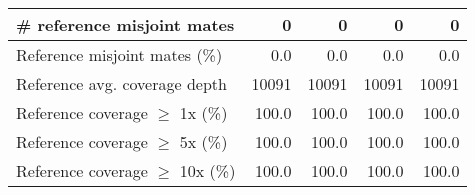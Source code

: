 \documentclass[12pt,a4paper]{article}
\begin{document}
\begin{table}[ht]
\begin{center}
\begin{tabular}{|l*{4}{|r}|}
\# reference misjoint mates & 0 & 0 & 0 & 0 \\ \hline
Reference misjoint mates (\%) & 0.0 & 0.0 & 0.0 & 0.0 \\ \hline
Reference avg. coverage depth & 10091 & 10091 & 10091 & 10091 \\ \hline
Reference coverage $\geq$ 1x (\%) & 100.0 & 100.0 & 100.0 & 100.0 \\ \hline
Reference coverage $\geq$ 5x (\%) & 100.0 & 100.0 & 100.0 & 100.0 \\ \hline
Reference coverage $\geq$ 10x (\%) & 100.0 & 100.0 & 100.0 & 100.0 \\ \hline
\end{tabular}
\end{center}
\end{table}
\end{document}
